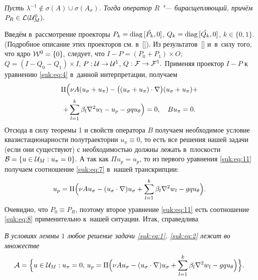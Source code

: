 \smallskip

\begin{lemma}[1]{\it Пусть $ { \lambda }^{-1} \not\in \sigma (A) \cup \sigma (A_{ \sigma }) $.
Тогда оператор $R$  "---  бирасщепляющий, причём $P_R \in {\cal L} ({\cal U}^0_M) .$}
\end{lemma}

\smallskip

Введём в~рассмотрение проекторы $ P_k ={\rm diag} \, [{\hat {P_k}}, 0]$, $Q_k ={\rm diag} \, [{\hat {Q_k}}, 0]$, $ k\in \{0, 1\}.$
(Подробное описание этих проекторов см. в~[]).
 Из результатов~[] и~в~силу того, что ядро ${\cal W}^0= \{ 0 \} ,$ следует, что $I-P=(P_0 + P_1)
\times O$, $Q=(I- Q_0 - Q_1) \times I$, $P: {\cal U} \to {\cal U}^1$, $Q: {\cal F} \to {\cal F}^1.$ Применяя проектор
$I-P$   к~ уравнению  \eqref{suk:eq:4}  в~данной  интерпретации, получаем
\begin{multline}
  \Pi \Bigl(\nu A (u_{\sigma } +u_{\pi } ) - \bigl((u_{\sigma } +u_{\pi } ) \cdot \nabla \bigr)
(u_{\sigma} + u_{\pi } ) + \\
+  \sum\limits_{l=1}^k {\beta}_l {\nabla}^2 w_l-  u_p - g q u_{\theta }\Bigr)=0,\quad B u_{\pi }=0.
\label{suk:eq:11}
\end{multline}
Отсюда в силу  теоремы 1 и свойств оператора $B$ получаем     необходимое     условие     квазистационарности
полутраектории $u_{\pi} \equiv 0 $, 
то есть все решения нашей задачи (если они  существуют)  с необходимостью должны лежать  в~плоскости  ${\cal B} = \{ u \in {\cal U}_M: u_{\pi}=0 \} .$
А так как $\Pi u_p =u_p$,  то  из первого  уравнения  \eqref{suk:eq:11}    получаем  соотношение \eqref{suk:eq:7} в~нашей транскрипции:
\begin{equation}
 u_p = \Pi \Bigl(\nu A u_{ \sigma } - (u_{ \sigma } \cdot \nabla ) u_{ \sigma }
+ \sum\limits_{l=1}^k {\beta}_l {\nabla}^2 w_l-g q u_{ \theta } \Bigr).
\label{suk:eq:12}
\end{equation}
Очевидно, что $ P_0 \equiv P_R $, поэтому второе уравнение \eqref{suk:eq:11} есть соотношение \eqref{suk:eq:8} применительно к~нашей ситуации.
Итак, справедлива

\smallskip

\begin{lemma}[2]{\it В  условиях леммы $1$ любое решение задачи \eqref{suk:eq:1},
\eqref{suk:eq:2} лежит во множестве }
$$
{\cal A}=\Bigl\{ u \in {\cal U}_M:  u_{\pi}=0, \, u_p=\Pi \Bigl(
\nu Au_{\sigma}-(u_{\sigma} \cdot \nabla )u_{\sigma} +\sum\limits_{l=1}^k {\beta}_l {\nabla}^2 w_l-g q u_{\theta }\Bigr) \Bigr\}. 
$$
\end{lemma}

